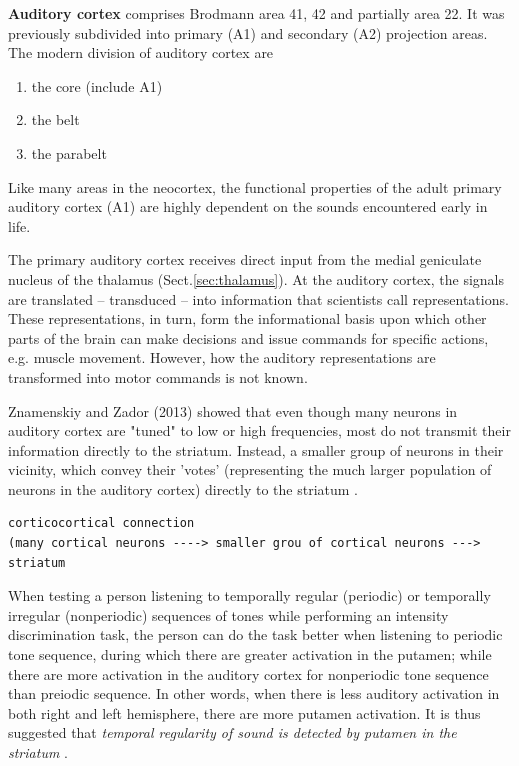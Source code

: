 {\bf Auditory cortex} comprises Brodmann area 41, 42 and partially area 22.
It was previously subdivided into primary (A1) and secondary (A2) projection
areas. The modern division of auditory cortex are
\begin{enumerate}
  \item the core (include A1)
  
  \item the belt 
  
  \item the parabelt
\end{enumerate}
Like many areas in the neocortex, the functional properties of the adult primary
auditory cortex (A1) are highly dependent on the sounds encountered early in
life.

The primary auditory cortex receives direct input from the medial geniculate
nucleus of the thalamus (Sect.\ref{sec:thalamus}).
At the auditory cortex, the signals are translated -- transduced -- into
information that scientists call representations. These representations, in
turn, form the informational basis upon which other parts of the brain can make
decisions and issue commands for specific actions, e.g. muscle movement.
However, how the auditory representations are transformed into motor commands is
not known.

Znamenskiy and Zador (2013) showed that even though many neurons in auditory
cortex are "tuned" to low or high frequencies, most do not transmit their
information directly to the striatum.
Instead, a smaller group of neurons in their vicinity, which convey their
'votes' (representing the much larger population of neurons in the auditory
cortex) directly to the striatum \citep{znamenskiy2013}.
\begin{verbatim}
corticocortical connection 
(many cortical neurons ----> smaller grou of cortical neurons ---> striatum
\end{verbatim}

When testing a person listening to temporally regular (periodic) or temporally
irregular (nonperiodic) sequences of tones while performing an intensity
discrimination task, the person can do the task better when listening to
periodic tone sequence, during which there are greater activation in the
putamen; while there are more activation in the auditory cortex for nonperiodic
tone sequence than preiodic sequence. In other words, when there is less
auditory activation in both right and left hemisphere, there are more putamen
activation. It is thus suggested that {\it temporal regularity of sound is
detected by putamen in the striatum} \citep{geiser2012}.

